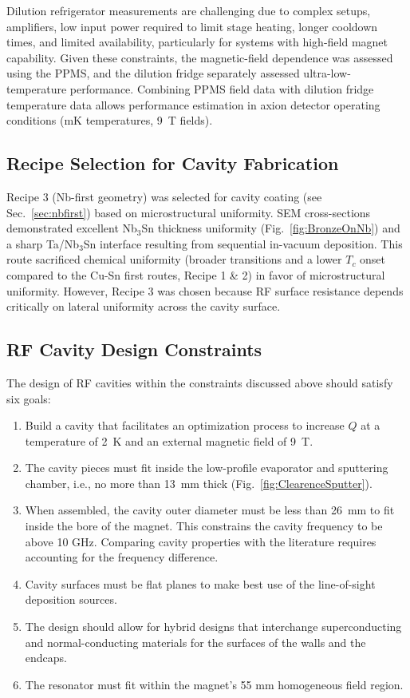     Dilution refrigerator measurements are challenging due to complex setups, amplifiers, low input power required to limit stage heating, longer cooldown times, and limited availability, particularly for systems with high-field magnet capability. Given these constraints, the magnetic-field dependence was assessed using the PPMS, and the dilution fridge separately assessed ultra-low-temperature performance. Combining PPMS field data with dilution fridge temperature data allows performance estimation in axion detector operating conditions (mK temperatures, 9~T fields).

        

    \subsection{Recipe Selection for Cavity Fabrication}\label{sec:recipe3}

    Recipe 3 (Nb-first geometry) was selected for cavity coating (see Sec.~\ref{sec:nbfirst}) based on microstructural uniformity. SEM cross-sections demonstrated excellent Nb$_3$Sn thickness uniformity (Fig.~\ref{fig:BronzeOnNb}) and a sharp Ta/Nb$_3$Sn interface resulting from sequential in-vacuum deposition. This route sacrificed chemical uniformity (broader transitions and a lower $T_c$ onset compared to the Cu-Sn first routes, Recipe 1 \& 2) in favor of microstructural uniformity. However, Recipe 3 was chosen because RF surface resistance depends critically on lateral uniformity across the cavity surface.
    
    \subsection{RF Cavity Design Constraints}
        
    \noindent The design of RF cavities within the constraints discussed above should satisfy six goals:
    \begin{enumerate}
        \item Build a cavity that facilitates an optimization process to increase $Q$ at a temperature of 2~K and an external magnetic field of 9~T.
        \item The cavity pieces must fit inside the low-profile evaporator and sputtering chamber, i.e., no more than 13~mm thick (Fig.~\ref{fig:ClearenceSputter}).
        \item When assembled, the cavity outer diameter must be less than 26~mm to fit inside the bore of the magnet. This constrains the cavity frequency to be above 10 GHz. Comparing cavity properties with the literature requires accounting for the frequency difference.
        \item Cavity surfaces must be flat planes to make best use of the line-of-sight deposition sources.
        \item The design should allow for hybrid designs that interchange superconducting and normal-conducting materials for the surfaces of the walls and the endcaps.
        \item The resonator must fit within the magnet's 55 mm homogeneous field region.
    \end{enumerate}

